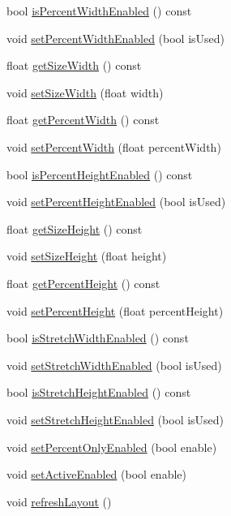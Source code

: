 \begin{DoxyCompactItemize}
bool \hyperlink{classui_1_1LayoutComponent_a7572a7ba515d90463eaa237ac9547275}{is\+Percent\+Width\+Enabled} () const
\item 
void \hyperlink{classui_1_1LayoutComponent_a225d5d4a20568a3a4a4b2f53732bdab4}{set\+Percent\+Width\+Enabled} (bool is\+Used)
\item 
float \hyperlink{classui_1_1LayoutComponent_afc2fc62ee5436a6e1a825e94ee69bc64}{get\+Size\+Width} () const
\item 
void \hyperlink{classui_1_1LayoutComponent_a38457ef477f1a6286021fabb7bce7ba2}{set\+Size\+Width} (float width)
\item 
float \hyperlink{classui_1_1LayoutComponent_a79288b7cb4520b1f81ab76b2541f7209}{get\+Percent\+Width} () const
\item 
void \hyperlink{classui_1_1LayoutComponent_a0cd30388085811c19d4939062e8643a5}{set\+Percent\+Width} (float percent\+Width)
\item 
bool \hyperlink{classui_1_1LayoutComponent_a79fe2006defc4f1f69104b415e800825}{is\+Percent\+Height\+Enabled} () const
\item 
void \hyperlink{classui_1_1LayoutComponent_aa3554e907c5770808e8ed24abb003996}{set\+Percent\+Height\+Enabled} (bool is\+Used)
\item 
float \hyperlink{classui_1_1LayoutComponent_aa00a66a58b28af9b2c685f09a0923922}{get\+Size\+Height} () const
\item 
void \hyperlink{classui_1_1LayoutComponent_a88bc0e190fff80351071bbeceea9045f}{set\+Size\+Height} (float height)
\item 
float \hyperlink{classui_1_1LayoutComponent_a45a619b652e86c0f3181dec2adba6954}{get\+Percent\+Height} () const
\item 
void \hyperlink{classui_1_1LayoutComponent_a6533514d789f5edb4c67c11bb7b45770}{set\+Percent\+Height} (float percent\+Height)
\item 
bool \hyperlink{classui_1_1LayoutComponent_abb95d248959215652769fb5db602ded1}{is\+Stretch\+Width\+Enabled} () const
\item 
void \hyperlink{classui_1_1LayoutComponent_a85301b7c5ca5edf04c2d1c30ac925e5e}{set\+Stretch\+Width\+Enabled} (bool is\+Used)
\item 
bool \hyperlink{classui_1_1LayoutComponent_ac380d08f28b0816cc1f2b4bc24be4123}{is\+Stretch\+Height\+Enabled} () const
\item 
void \hyperlink{classui_1_1LayoutComponent_a65abc1aa634d8acc866c0be757ae17a9}{set\+Stretch\+Height\+Enabled} (bool is\+Used)
\item 
void \hyperlink{classui_1_1LayoutComponent_a8ccc6b1eed66db106bb11906244aad89}{set\+Percent\+Only\+Enabled} (bool enable)
\item 
void \hyperlink{classui_1_1LayoutComponent_a781f5c70717d610553e5be7ece0b392f}{set\+Active\+Enabled} (bool enable)
\item 
void \hyperlink{classui_1_1LayoutComponent_a71d6fd230951a624210a0501033a9c56}{refresh\+Layout} ()
\end{DoxyCompactItemize}
